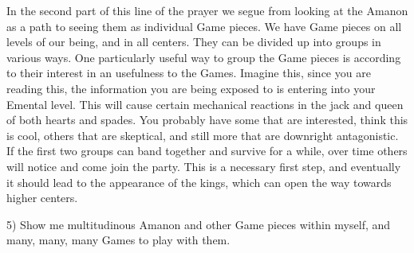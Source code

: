 \documentclass[12pt,letterpaper]{book}
\begin{document}
In the second part of this line of the prayer we segue from looking at the Amanon as a path to seeing them as individual Game pieces. We have Game pieces on all levels of our being, and in all centers. They can be divided up into groups in various ways. One particularly useful way to group the Game pieces is according to their interest in an usefulness to the Games. Imagine this, since you are reading this, the information you are being exposed to is entering into your Emental level. This will cause certain mechanical reactions in the jack and queen of both hearts and spades. You probably have some that are interested, think this is cool, others that are skeptical, and still more that are downright antagonistic. If the first two groups can band together and survive for a while, over time others will notice and come join the party. This is a necessary first step, and eventually it should lead to the appearance of the kings, which can open the way towards higher centers.

5) Show me multitudinous Amanon and other Game pieces within myself, and many, many, many Games to play with them.
\end{document}
